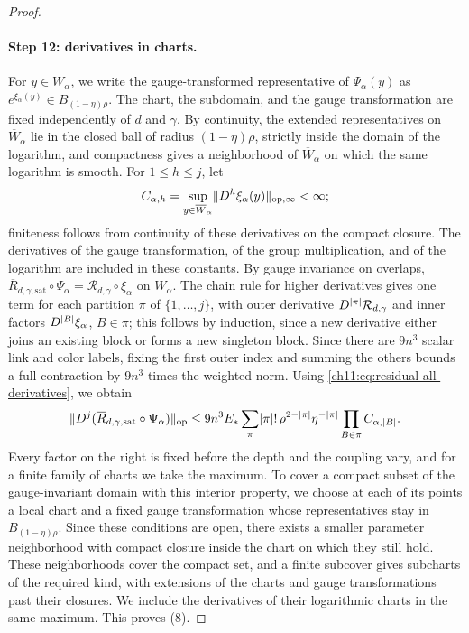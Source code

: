 \begin{proof}
\paragraph{Step 12: derivatives in charts.}
For $y\in W_\alpha$, we write the gauge-transformed representative of $\Psi_\alpha(y)$ as $e^{\xi_\alpha(y)}\in B_{(1-\eta)\rho}$. The chart, the subdomain, and the gauge transformation are fixed independently of $d$ and $\gamma$. By continuity, the extended representatives on $\overline W_\alpha$ lie in the closed ball of radius $(1-\eta)\rho$, strictly inside the domain of the logarithm, and compactness gives a neighborhood of $\overline W_\alpha$ on which the same logarithm is smooth. For $1\le h\le j$, let
\[
 C_{\alpha,h}=\sup_{y\in\overline W_\alpha}\lVert D^h\xi_\alpha(y)\rVert_{\mathrm{op},\infty}<\infty;
\]
finiteness follows from continuity of these derivatives on the compact closure. The derivatives of the gauge transformation, of the group multiplication, and of the logarithm are included in these constants. By gauge invariance on overlaps, $\overline R_{d,\gamma,\mathrm{sat}}\circ\Psi_\alpha=\mathcal R_{d,\gamma}\circ\xi_\alpha$ on $W_\alpha$. The chain rule for higher derivatives gives one term for each partition $\pi$ of $\{1,\dots,j\}$, with outer derivative $D^{\lvert \pi\rvert}\mathcal R_{d,\gamma}$ and inner factors $D^{\lvert B\rvert}\xi_\alpha$, $B\in\pi$; this follows by induction, since a new derivative either joins an existing block or forms a new singleton block. Since there are $9n^3$ scalar link and color labels, fixing the first outer index and summing the others bounds a full contraction by $9n^3$ times the weighted norm. Using \eqref{ch11:eq:residual-all-derivatives}, we obtain
\begin{equation}\label{ch11:eq:residual-chart-derivatives}
 \lVert D^j(\overline R_{d,\gamma,\mathrm{sat}}\circ\Psi_\alpha)\rVert_{\mathrm{op}}
 \le9n^3E_*\sum_\pi\lvert \pi\rvert!\,\rho^{2-\lvert \pi\rvert}\eta^{-\lvert \pi\rvert}\prod_{B\in\pi}C_{\alpha,\lvert B\rvert}.
\end{equation}
Every factor on the right is fixed before the depth and the coupling vary, and for a finite family of charts we take the maximum. To cover a compact subset of the gauge-invariant domain with this interior property, we choose at each of its points a local chart and a fixed gauge transformation whose representatives stay in $B_{(1-\eta)\rho}$. Since these conditions are open, there exists a smaller parameter neighborhood with compact closure inside the chart on which they still hold. These neighborhoods cover the compact set, and a finite subcover gives subcharts of the required kind, with extensions of the charts and gauge transformations past their closures. We include the derivatives of their logarithmic charts in the same maximum. This proves (8).


\end{proof}

